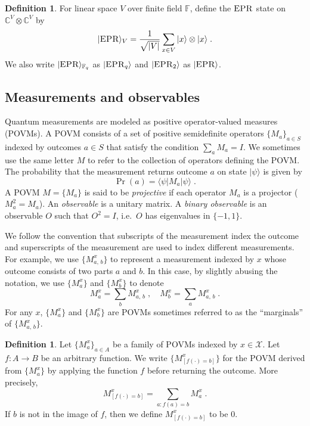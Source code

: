 \documentclass[11pt]{article}
\theoremstyle{definition}
\newtheorem{definition}[theorem]{Definition}
\newcommand{\ket}[1]{|#1\rangle}
\newcommand{\bra}[1]{\langle#1|}
\newcommand{\Id}{\ensuremath{I}}
\newcommand{\C}{\ensuremath{\mathbb{C}}}
\newcommand{\F}{\ensuremath{\mathbb{F}}}
\newcommand{\abs}[1]{\left\vert {#1} \right\vert}
\newcommand{\labelstyle}[1]{\ensuremath{\textsc{#1}}\xspace}
\newcommand{\EPR}{\labelstyle{EPR}}
\renewcommand{\cal}[1]{\mathcal{#1}}
\begin{document}
\begin{definition}
  \label{def:EPR}
  For linear space $V$ over finite field $\F$, define the \EPR state on $\C^V
  \otimes \C^V$ by
  \begin{equation*}
    \ket{\EPR}_V = \frac{1}{\sqrt{\abs{V}}} \sum_{x\in V}\ket {x}\otimes \ket{x}\;.
  \end{equation*}
  We also write $\ket{\EPR}_{\F_q}$ as $\ket{\EPR_q}$ and $\ket{\EPR_2}$ as
  $\ket{\EPR}$.
\end{definition}

\subsection{Measurements and observables}

Quantum measurements are modeled as positive operator-valued
measures (POVMs).
A POVM consists of a set of positive semidefinite operators $\{ M_a \}_{a\in S}$
indexed by outcomes $a\in S$ that satisfy the condition $\sum_a M_a = I$.
We sometimes use the same letter $M$ to refer to the collection of operators
defining the POVM.
The probability that the measurement returns outcome $a$ on state $\ket{\psi}$
is given by
\begin{equation*}
  \Pr(a) = \bra{\psi} M_a \ket{\psi}\;.
\end{equation*}
A POVM $M=\{M_a\}$ is said to be \emph{projective} if each operator $M_a$ is a
projector ($M_a^2 = M_a$).
An \emph{observable} is a unitary matrix.
A \emph{binary observable} is an observable $O$ such that $O^2 = \Id$, i.e.\ $O$
has eigenvalues in $\{-1,1\}$.

We follow the convention that subscripts of the measurement index
the outcome and superscripts of the measurement are used to index different
measurements.
For example, we use $\{M^x_{a,\, b}\}$ to represent a measurement indexed by $x$
whose outcome consists of two parts $a$ and $b$.
In this case, by slightly abusing the notation, we use $\{M^x_a\}$ and $\{M^x_b\}$
to denote
\begin{equation*}
  M^x_a = \sum_b M^x_{a,\, b}\;, \quad M^x_b = \sum_a M^x_{a,\, b}\;.
\end{equation*}
For any $x$, $\{M^x_a\}$ and $\{M^x_b\}$ are POVMs sometimes referred to as the
``marginals'' of $\{M^x_{a,\, b}\}$.

\begin{definition}
  \label{def:bracket}
  Let $\{M^x_a\}_{a\in A}$ be a family of POVMs indexed by $x\in \cal{X}$.
  Let $f:A\to B$ be an arbitrary function.
  We write $\bigl\{ M^x_{[f(\cdot)=b]} \bigr\}$ for the POVM derived from
  $\{M^x_a\}$ by applying the function $f$ before returning the outcome.
  More precisely,
\begin{equation*}
  M^x_{[f(\cdot) = b]} = \sum_{a : f(a)=b} M^x_a\;.
\end{equation*}
If $b$ is not in the image of $f$, then we define $M^x_{[f(\cdot) = b]}$ to be
$0$.
\end{definition}
\end{document}
